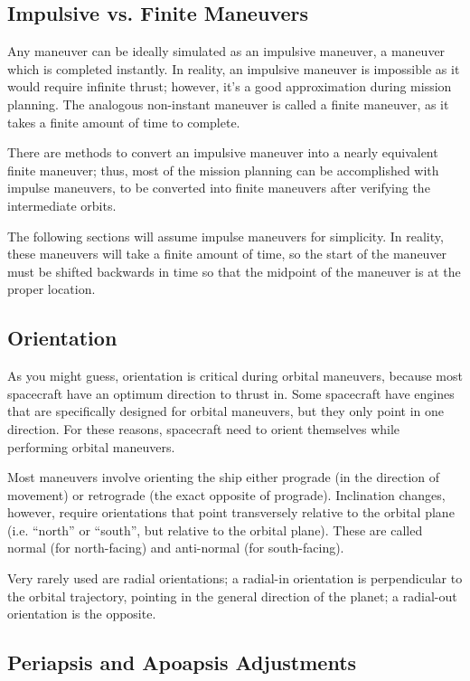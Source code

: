 \subsection{Impulsive vs. Finite Maneuvers}

Any maneuver can be ideally simulated as an impulsive maneuver, a
maneuver which is completed instantly. In reality, an impulsive
maneuver is impossible as it would require infinite thrust; however,
it's a good approximation during mission planning. The analogous
non-instant maneuver is called a finite maneuver, as it takes a finite
amount of time to complete.

There are methods to convert an impulsive maneuver into a nearly
equivalent finite maneuver; thus, most of the mission planning can be
accomplished with impulse maneuvers, to be converted into finite
maneuvers after verifying the intermediate orbits.

The following sections will assume impulse maneuvers for
simplicity. In reality, these maneuvers will take a finite amount of
time, so the start of the maneuver must be shifted backwards in time
so that the midpoint of the maneuver is at the proper location.

\subsection{Orientation}

As you might guess, orientation is critical during orbital maneuvers,
because most spacecraft have an optimum direction to thrust in. Some
spacecraft have engines that are specifically designed for orbital
maneuvers, but they only point in one direction. For these reasons,
spacecraft need to orient themselves while performing orbital
maneuvers.

Most maneuvers involve orienting the ship either prograde (in the
direction of movement) or retrograde (the exact opposite of
prograde). Inclination changes, however, require orientations that
point transversely relative to the orbital plane (i.e. ``north'' or
``south'', but relative to the orbital plane). These are called normal
(for north-facing) and anti-normal (for south-facing).

Very rarely used are radial orientations; a radial-in orientation is
perpendicular to the orbital trajectory, pointing in the general
direction of the planet; a radial-out orientation is the opposite.

\subsection{Periapsis and Apoapsis Adjustments}

